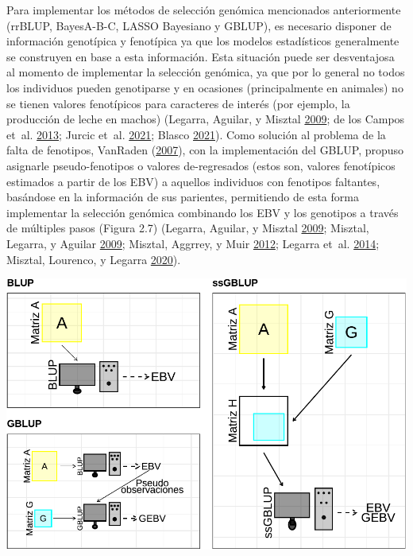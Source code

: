 \documentclass[11pt,spanish,a4paper,oneside,]{book} %
\begin{document}
Para implementar los métodos de selección genómica mencionados anteriormente (rrBLUP, BayesA-B-C, LASSO Bayesiano y GBLUP), es necesario disponer de información genotípica y fenotípica ya que los modelos estadísticos generalmente se construyen en base a esta información. Esta situación puede ser desventajosa al momento de implementar la selección genómica, ya que por lo general no todos los individuos pueden genotiparse y en ocasiones (principalmente en animales) no se tienen valores fenotípicos para caracteres de interés (por ejemplo, la producción de leche en machos) (Legarra, Aguilar, y Misztal \protect\hyperlink{ref-cite:17}{2009}; de los Campos et~al. \protect\hyperlink{ref-cite:31}{2013}; Jurcic et~al. \protect\hyperlink{ref-cite:11}{2021}; Blasco \protect\hyperlink{ref-cite:21}{2021}). Como solución al problema de la falta de fenotipos, VanRaden (\protect\hyperlink{ref-cite:39}{2007}), con la implementación del GBLUP, propuso asignarle pseudo-fenotipos o valores de-regresados (estos son, valores fenotípicos estimados a partir de los EBV) a aquellos individuos con fenotipos faltantes, basándose en la información de sus parientes, permitiendo de esta forma implementar la selección genómica combinando los EBV y los genotipos a través de múltiples pasos (Figura 2.7) (Legarra, Aguilar, y Misztal \protect\hyperlink{ref-cite:17}{2009}; Misztal, Legarra, y Aguilar \protect\hyperlink{ref-cite:16}{2009}; Misztal, Aggrrey, y Muir \protect\hyperlink{ref-cite:14}{2012}; Legarra et~al. \protect\hyperlink{ref-cite:15}{2014}; Misztal, Lourenco, y Legarra \protect\hyperlink{ref-cite:18}{2020}).

\begin{center}\includegraphics[width=1\linewidth]{figures/BLUPs} \end{center}
\end{document}
